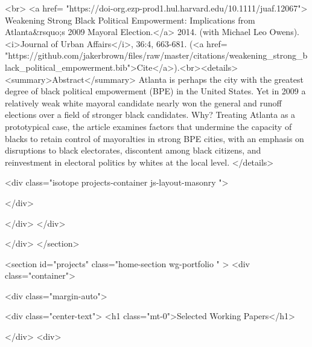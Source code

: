 <br>
<a href= "https://doi-org.ezp-prod1.hul.harvard.edu/10.1111/juaf.12067"> Weakening Strong Black Political Empowerment: Implications from Atlanta&rsquo;s 2009 Mayoral Election.</a> 2014. (with Michael Leo Owens). <i>Journal of Urban Affairs</i>, 36:4, 663-681. (<a href= "https://github.com/jakerbrown/files/raw/master/citations/weakening_strong_black_political_empowerment.bib">Cite</a>).<br><details>
        <summary>Abstract</summary>
Atlanta is perhaps the city with the greatest degree of black political empowerment (BPE) in the United States. Yet in 2009 a relatively weak white mayoral candidate nearly won the general and runoff elections over a field of stronger black candidates. Why? Treating Atlanta as a prototypical case, the article examines factors that undermine the capacity of blacks to retain control of mayoralties in strong BPE cities, with an emphasis on disruptions to black electorates, discontent among black citizens, and reinvestment in electoral politics by whites at the local level.
      </details>




    <div class="isotope projects-container js-layout-masonry ">

    </div>

  </div>
</div>

    </div>
  </section>































  <section id="projects" class="home-section wg-portfolio   "  >
    <div class="container">











<div class="margin-auto">

  <div class="center-text">
    <h1 class="mt-0">Selected Working Papers</h1>

  </div>
  <div>

